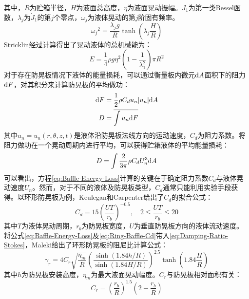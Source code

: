 其中，$R$为贮箱半径，$H$为液面总高度，$\eta$为液面晃动振幅。$J_1$为第一类Bessel函数，$\lambda_j$为$\dot{J}_1$的第$j$个零点，$\omega_j$为液体晃动的第$j$阶固有频率。
\begin{displaymath}
	{\omega_j}^2=\frac{\lambda_j g}{R}\tanh \left( \lambda_j \frac{H}{R} \right)
\end{displaymath}
Stricklin经过计算得出了晃动液体的总机械能为\cite{Stricklin:1966}：
\begin{equation}
	E=\frac{1}{4} \rho g \eta^2 \left( 1- \frac{1}{\lambda_1^2} \right)\pi R^2
\end{equation}
对于存在防晃板情况下液体的能量损耗，可以通过衡量板内微元$\mathrm{d} A$面积下的阻力$\mathrm{d} F$，对其积分来计算防晃板的平均做功：
\begin{align}
	\mathrm{d} F&=\frac{1}{2}\rho C_d u_n|u_n|\mathrm{d} A \\
	D&=\overline{\int u_n \mathrm{d} F}
\end{align}
其中$u_n=u_n(r,\theta,z,t)$是液体沿防晃板法线方向的运动速度，$C_d$为阻力系数。将阻力做功在一个晃动周期内进行平均，可以获得贮箱液体的平均能量损耗：
\begin{equation}
	\label{eq:Baffle-Energy-Loss}
	D=\int\frac{2}{3\pi}\rho C_dU_n^3 \ud A
\end{equation}
可以看出，方程\eqref{eq:Baffle-Energy-Loss}计算的关键在于确定阻力系数$C_d$与液体晃动速度$U_n$。然而，对于不同的液体及防晃板类型，$C_d$通常只能利用实验手段获得。以环形防晃板为例，Keulegan和Carpenter给出了$C_d$的拟合公式\cite{Keulegan:1958}：
\begin{equation}
	\label{eq:Ring-Baffle-Cd}
	C_d=15 \left( \frac{UT}{r_b} \right)^{-0.5},\quad 2\leq \frac{UT}{r_b} \leq 20
\end{equation}
其中$T$为液体晃动周期，$r_b$为防晃板宽度，$U$为垂直防晃板方向的液体流动速度。将公式\eqref{eq:Baffle-Energy-Loss}及\eqref{eq:Ring-Baffle-Cd}带入\eqref{eq:Damping-Ratio-Stokes}，Maleki给出了环形防晃板的阻尼比计算公式\cite{Maleki:2008}：
\begin{equation}
	\label{eq:Ring-Baffle-Damping-Ratio}
	\gamma_r=4C_r \sqrt{\frac{\eta_m}{R}} \left( \frac{\sinh (1.84h/R)}{\sinh (1.84H/R)} \right)^{2.5} \tanh \left( 1.84\frac{H}{R} \right)
\end{equation}
其中$h$为防晃板安装高度，$\eta_m$为最大液面晃动幅度。$C_r$与防晃板相对面积有关：
\begin{equation}
	C_r=\left(\frac{r_b}{R}\right)^{1.5} \left(2- \frac{r_b}{R}\right) 
\end{equation}

